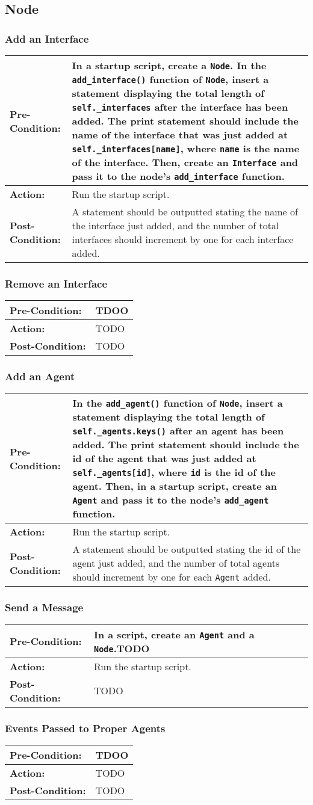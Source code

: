 \documentclass[titlepage]{article}
\newcommand{\testcase}[3]{
    \begin{center}
    \begin{tabular}{| l | p{0.7\textwidth}|}
        \hline
        \rowcolor[gray]{0.8}\textbf{Pre-Condition:} & #1 \\ \hline
        \textbf{Action:} & #2 \\ \hline
        \rowcolor[gray]{0.8}\textbf{Post-Condition:} & #3 \\ \hline
    \end{tabular}
    \end{center}
}
\begin{document}
\subsection{Node}
\subsubsection{Add an Interface}
\testcase{In a startup script, create a \texttt{Node}.  In the \texttt{add\_interface()} function of \texttt{Node}, insert a statement displaying the total length of \texttt{self.\_interfaces} after the interface has been added. The print statement should include the name of the interface that was just added at \texttt{self.\_interfaces[name]}, where \texttt{name} is the name of the interface.  Then, create an \texttt{Interface} and pass it to the node's \texttt{add\_interface} function.}{Run the startup script.}{A statement should be outputted stating the name of the interface just added, and the number of total interfaces should increment by one for each interface added.}

\subsubsection{Remove an Interface}
\testcase{TDOO}{TODO}{TODO}

\subsubsection{Add an Agent}
\testcase{In the \texttt{add\_agent()} function of \texttt{Node}, insert a statement displaying the total length of \texttt{self.\_agents.keys()} after an agent has been added. The print statement should include the id of the agent that was just added at \texttt{self.\_agents[id]}, where \texttt{id} is the id of the agent.  Then, in a startup script, create an \texttt{Agent} and pass it to the node's \texttt{add\_agent} function.}{Run the startup script.}{A statement should be outputted stating the id of the agent just added, and the number of total agents should increment by one for each \texttt{Agent} added.}

\subsubsection{Send a Message}
\testcase{In a script, create an \texttt{Agent} and a \texttt{Node}.TODO}{Run the startup script.}{TODO}

\subsubsection{Events Passed to Proper Agents}
\testcase{TDOO}{TODO}{TODO}
\end{document}
